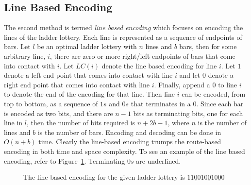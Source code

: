 \subsection{Line Based Encoding}
The second method is termed \emph{line based encoding} which focuses 
on encoding the lines of the ladder lottery. Each line is represented 
as a sequence of endpoints of bars. Let $l$ be an optimal ladder lottery 
with $n$ lines and $b$ bars, then for some arbitrary line, $i$, there 
are zero or more right/left endpoints of bars that 
come into contact with $i$. Let $LC(i)$ denote the line based encoding for line $i$.
Let $1$ denote a left end point that 
comes into contact with line $i$ and let $0$ denote a right 
end point that comes into contact with line $i$. Finally, append a $0$
to line $i$ to denote the end of the encoding for that line. Then line $i$ can be 
encoded, from top to bottom, as a sequence of $1s$ and $0s$ that 
terminates in a $0$.  
Since each bar is encoded as two bits, and there are $n-1$ bits as terminating bits, 
one for each line in $l$, then the number of bits required is $n + 2b -1$, where $n$
is the number of lines and $b$ is the number of bars. Encoding and decoding can be 
done in $O(n+b)$ time. Clearly the line-based encoding 
trumps the route-based encoding in both time and space complexity. To see an example 
of the line based encoding, refer to Figure~\ref{Fig:LineBasedEncoding}. Terminating $0s$ 
are underlined.
\begin{figure}[ht]
    \centering
    \caption{The line based encoding for the given ladder lottery is $11\underline{0}010\underline{0}10\underline{0}0$}
    \label{Fig:LineBasedEncoding}
\end{figure}


